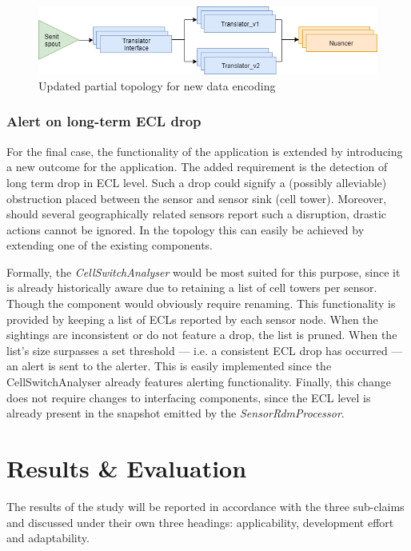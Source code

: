 \begin{figure}
\centering
\includegraphics[width=\textwidth]{resources/img/update_encoding.png}
\caption{Updated partial topology for new data encoding}
\label{fig:update_encoding}
\end{figure}

\subsubsection{Alert on long-term ECL drop}
For the final case, the functionality of the application is extended by introducing a new outcome for the application. The added requirement is the detection of long term drop in ECL level. Such a drop could signify a (possibly alleviable) obstruction placed between the sensor and sensor sink (cell tower). Moreover, should several geographically related sensors report such a disruption, drastic actions cannot be ignored. In the topology this can easily be achieved by extending one of the existing components. 

Formally, the \emph{CellSwitchAnalyser} would be most suited for this purpose, since it is already historically aware due to retaining a list of cell towers per sensor. Though the component would obviously require renaming. This functionality is provided by keeping a list of ECLs reported by each sensor node. When the sightings are inconsistent or do not feature a drop, the list is pruned. When the list's size surpasses a set threshold --- i.e. a consistent ECL drop has occurred --- an alert is sent to the alerter. This is easily implemented since the CellSwitchAnalyser already features alerting functionality. Finally, this change does not require changes to interfacing components, since the ECL level is already present in the snapshot emitted by the \emph{SensorRdmProcessor}.

\section{Results \& Evaluation}
\label{sec:resultseval}
The results of the study will be reported in accordance with the three sub-claims and discussed under their own three headings: applicability, development effort and adaptability.

